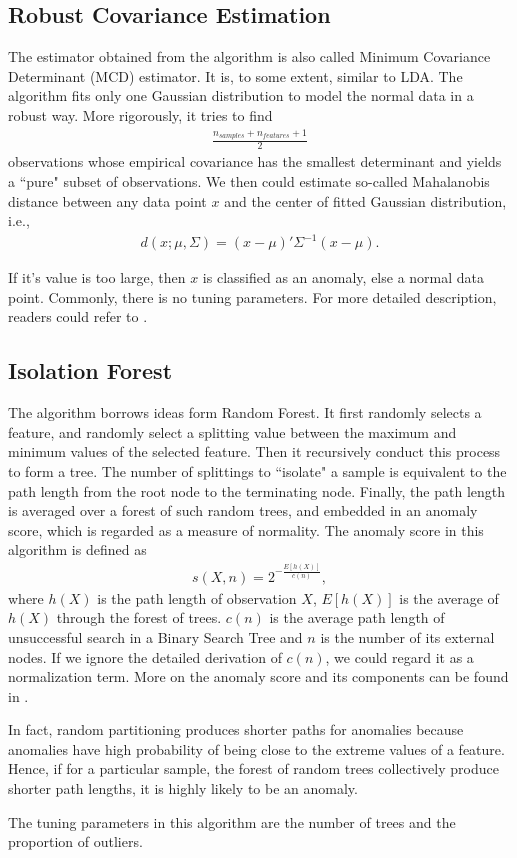 \documentclass[english]{article}
\newenvironment{eqt}{\begin{equation}\begin{aligned}}{\end{aligned}\end{equation}}
\begin{document}
\subsection{Robust Covariance Estimation}
\par
The estimator obtained from the algorithm is also called Minimum Covariance Determinant (MCD) estimator. It is, to some extent, similar to LDA. The algorithm fits only one Gaussian distribution to model the normal data in a robust way. More rigorously, it tries to find 
\begin{eqt}
\frac{n_{\textit{samples}}+n_{\textit{features}}+1}{2}
\end{eqt}
observations whose empirical covariance has the smallest determinant and yields a ``pure" subset of observations. We then could estimate so-called Mahalanobis distance between any data point $x$ and the center of fitted Gaussian distribution, i.e., 
\begin{eqt}
\label{mahadist}
d(x; \mu, \Sigma) = (x-\mu)'\Sigma^{-1}(x-\mu).
\end{eqt}
\par
If it's value is too large, then $x$ is classified as an anomaly, else a normal data point. Commonly, there is no tuning parameters. For more detailed description, readers could refer to \cite{robustcov}.


\subsection{Isolation Forest}
\par
The algorithm borrows ideas form Random Forest. It first randomly selects a feature, and randomly select a splitting value between the maximum and minimum values of the selected feature. Then it recursively conduct this process to form a tree. The number of splittings to ``isolate" a sample is equivalent to the path length from the root node to the terminating node. Finally, the path length is averaged over a forest of such random trees, and embedded in an anomaly score, which is regarded as a measure of normality. The anomaly score in this algorithm is defined as 
\begin{eqt}
s(X, n) = 2^{-\frac{E[h(X)]}{c(n)}},
\end{eqt}
where $h(X)$ is the path length of observation $X$, $E[h(X)]$ is the average of $h(X)$ through the forest of trees. $c(n)$ is the average path length of unsuccessful search in a Binary Search Tree and $n$ is the number of its external nodes. If we ignore the detailed derivation of $c(n)$, we could regard it as a normalization term. More on the anomaly score and its components can be found in \cite{isolationforest}.
\par
In fact, random partitioning produces shorter paths for anomalies because anomalies have high probability of being close to the extreme values of a feature. Hence, if for a particular sample, the forest of random trees collectively produce shorter path lengths, it is highly likely to be an anomaly.
\par The tuning parameters in this algorithm are the number of trees and the proportion of outliers.
\end{document}
